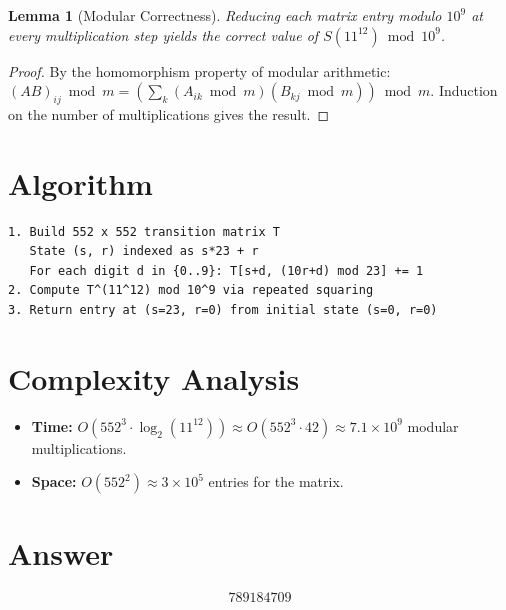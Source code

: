 \documentclass[12pt]{article}
\newtheorem{lemma}[theorem]{Lemma}
\begin{document}
\begin{lemma}[Modular Correctness]
Reducing each matrix entry modulo $10^9$ at every multiplication step yields the correct value of $S(11^{12}) \bmod 10^9$.
\end{lemma}

\begin{proof}
By the homomorphism property of modular arithmetic: $(AB)_{ij} \bmod m = \left(\sum_k (A_{ik} \bmod m)(B_{kj} \bmod m)\right) \bmod m$. Induction on the number of multiplications gives the result.
\end{proof}

\section{Algorithm}

\begin{verbatim}
1. Build 552 x 552 transition matrix T
   State (s, r) indexed as s*23 + r
   For each digit d in {0..9}: T[s+d, (10r+d) mod 23] += 1
2. Compute T^(11^12) mod 10^9 via repeated squaring
3. Return entry at (s=23, r=0) from initial state (s=0, r=0)
\end{verbatim}

\section{Complexity Analysis}
\begin{itemize}
\item \textbf{Time:} $O(552^3 \cdot \log_2(11^{12})) \approx O(552^3 \cdot 42) \approx 7.1 \times 10^9$ modular multiplications.
\item \textbf{Space:} $O(552^2) \approx 3 \times 10^5$ entries for the matrix.
\end{itemize}

\section{Answer}

\[
\boxed{789184709}
\]
\end{document}
